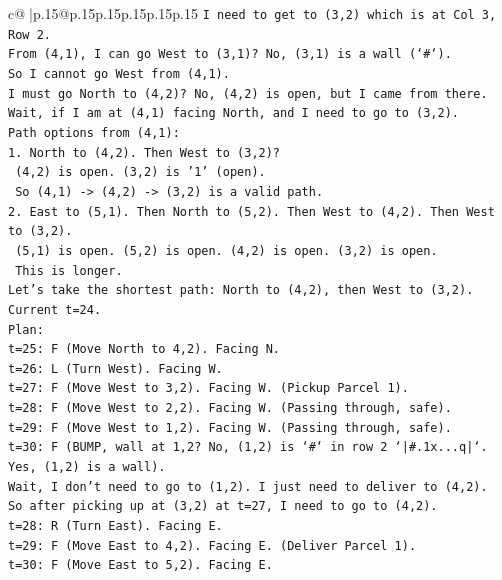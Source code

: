 \documentclass{article}
\begin{document}
{\begin{supertabular}{c@{$\;$}|p{.15\linewidth}@{}p{.15\linewidth}p{.15\linewidth}p{.15\linewidth}p{.15\linewidth}p{.15\linewidth}}
{{{\texttt{I need to get to (3,2) which is at Col 3, Row 2.} \\
\texttt{From (4,1), I can go West to (3,1)? No, (3,1) is a wall (`\#`).} \\
\texttt{So I cannot go West from (4,1).} \\
\texttt{I must go North to (4,2)? No, (4,2) is open, but I came from there.} \\
\texttt{Wait, if I am at (4,1) facing North, and I need to go to (3,2).} \\
\texttt{Path options from (4,1):} \\
\texttt{1. North to (4,2). Then West to (3,2)?} \\
\texttt{   (4,2) is open. (3,2) is '1' (open).} \\
\texttt{   So (4,1) {-}> (4,2) {-}> (3,2) is a valid path.} \\
\texttt{2. East to (5,1). Then North to (5,2). Then West to (4,2). Then West to (3,2).} \\
\texttt{   (5,1) is open. (5,2) is open. (4,2) is open. (3,2) is open.} \\
\texttt{   This is longer.} \\
\texttt{Let's take the shortest path: North to (4,2), then West to (3,2).} \\
\texttt{Current t=24.} \\
\texttt{Plan:} \\
\texttt{t=25: F (Move North to 4,2). Facing N.} \\
\texttt{t=26: L (Turn West). Facing W.} \\
\texttt{t=27: F (Move West to 3,2). Facing W. (Pickup Parcel 1).} \\
\texttt{t=28: F (Move West to 2,2). Facing W. (Passing through, safe).} \\
\texttt{t=29: F (Move West to 1,2). Facing W. (Passing through, safe).} \\
\texttt{t=30: F (BUMP, wall at 1,2? No, (1,2) is `\#` in row 2 `|\#.1x...q|`. Yes, (1,2) is a wall).} \\
\texttt{Wait, I don't need to go to (1,2). I just need to deliver to (4,2).} \\
\texttt{So after picking up at (3,2) at t=27, I need to go to (4,2).} \\
\texttt{t=28: R (Turn East). Facing E.} \\
\texttt{t=29: F (Move East to 4,2). Facing E. (Deliver Parcel 1).} \\
\texttt{t=30: F (Move East to 5,2). Facing E.} \\
}}}
\end{supertabular}}
\end{document}
